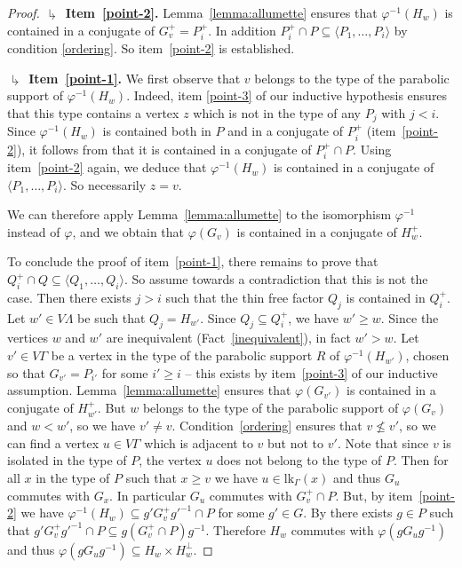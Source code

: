 \documentclass[a4paper,english,11pt]{article}
\theoremstyle{definition}
\theoremstyle{remark}
\newcommand{\lk}{\mathrm{lk}}
\begin{document}
\begin{proof}
\smallskip

\textbf{$\drsh$ Item~\ref{point-2}.} Lemma~\ref{lemma:allumette} ensures that $\varphi^{-1}(H_w)$ is {contained in a conjugate of} $G^+_v=P^+_i$. In addition $P_i^+\cap P\subseteq \langle P_1,\dots,P_i\rangle$ {by condition \eqref{ordering}}. So item~\ref{point-2} is established.

\smallskip

\textbf{$\drsh$ Item~\ref{point-1}.} We first observe that $v$ belongs to {the type of the parabolic} support of $\varphi^{-1}(H_w)$. Indeed, item \ref{point-3} of our inductive hypothesis ensures that this {type} contains a vertex $z$ which is not in the type of any $P_j$ with $j<i$. Since $\varphi^{-1}(H_w)$ is contained both in $P$ and in a conjugate of $P_i^+$ (item~\ref{point-2}), it follows from \cite[Proposition~3.4]{AM} that it is contained in a conjugate of $P_i^+\cap P$. Using item~\ref{point-2} again, we deduce that $\varphi^{-1}(H_w)$ is contained in a conjugate of $\langle P_1,\dots,P_i\rangle$. So necessarily $z=v$.

We can therefore apply Lemma~\ref{lemma:allumette} to the isomorphism $\varphi^{-1}$ instead of $\varphi$, and we obtain that $\varphi(G_v)$ is contained in a conjugate of $H_w^+$.

To conclude the proof of item~\ref{point-1}, there remains to prove that $Q_i^+\cap Q\subseteq\langle Q_1,\dots,Q_i\rangle$. So assume towards a contradiction that this is not the case. Then there exists $j>i$ such that the thin free factor $Q_j$ is contained in $Q_i^+$. Let $w'\in V\Lambda$ be such that $Q_j=H_{w'}$. Since $Q_j\subseteq Q_i^+$, we have $w'\ge w$. Since the vertices $w$ and $w'$ are inequivalent (Fact~\eqref{inequivalent}), in fact $w'>w$. Let $v'\in V\Gamma$ be a vertex in the type of the parabolic support $R$ of $\varphi^{-1}(H_{w'})$, chosen so that $G_{v'}=P_{i'}$ for some $i'\ge i$ -- this exists by item~\ref{point-3} of our inductive assumption. Lemma~\ref{lemma:allumette} ensures that $\varphi(G_{v'})$ is contained in a conjugate of $H_{w'}^+$. {But} $w$ belongs to the type of the parabolic support of $\varphi(G_v)$ and $w<w'$, so we have $v'\neq v$. Condition~\eqref{ordering} ensures that $v\not\leq v'$, so we can find a vertex $u\in V\Gamma$ which is adjacent to $v$ but not to $v'$. Note that since $v$ is isolated in the type of $P$, the vertex $u$ does not belong to the type of $P$. Then for all $x$ in the type of $P$ such that $x\geq v$ we have $u\in \lk_{\Gamma}(x)$ and thus $G_u$ commutes with $G_x$. In particular $G_u$ commutes with $G^+_v\cap P$. But, by item~{\ref{point-2}} we have $\varphi^{-1}(H_w)\subseteq g'G_v^+{g'}^{-1}\cap P$ for some $g'\in G$. By \cite[Proposition~3.4]{AM} there exists $g\in P$ such that $g'G_v^+{g'}^{-1}\cap P\subseteq g(G^+_v\cap P) g^{-1}$. Therefore $H_w$ commutes with $\varphi(gG_ug^{-1})$ and thus $\varphi(gG_ug^{-1})\subseteq H_w\times H_w^\perp$.


\end{proof}
\end{document}
